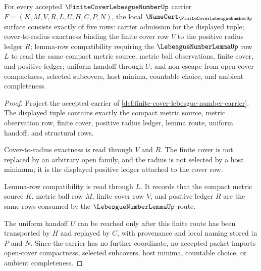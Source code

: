 \begin{theorem}
\label{thm:finite-cover-lebesgue-number-namecert-obligations}
For every accepted $\FiniteCoverLebesgueNumberUp$ carrier $F=(K,M,V,R,L,U,H,C,P,N)$, the local $\NameCert_{\FiniteCoverLebesgueNumberUp}$ surface consists exactly of five rows: carrier admission for the displayed tuple; cover-to-radius exactness binding the finite cover row $V$ to the positive radius ledger $R$; lemma-row compatibility requiring the $\LebesgueNumberLemmaUp$ row $L$ to read the same compact metric source, metric ball observations, finite cover, and positive ledger; uniform handoff through $U$; and non-escape from open-cover compactness, selected subcovers, host minima, countable choice, and ambient completeness.
\end{theorem}
\begin{proof}
Project the accepted carrier of \autoref{def:finite-cover-lebesgue-number-carrier}. The displayed tuple contains exactly the compact metric source, metric observation row, finite cover, positive radius ledger, lemma route, uniform handoff, and structural rows.

Cover-to-radius exactness is read through $V$ and $R$. The finite cover is not replaced by an arbitrary open family, and the radius is not selected by a host minimum; it is the displayed positive ledger attached to the cover row.

Lemma-row compatibility is read through $L$. It records that the compact metric source $K$, metric ball row $M$, finite cover row $V$, and positive ledger $R$ are the same rows consumed by the $\LebesgueNumberLemmaUp$ route.

The uniform handoff $U$ can be reached only after this finite route has been transported by $H$ and replayed by $C$, with provenance and local naming stored in $P$ and $N$. Since the carrier has no further coordinate, no accepted packet imports open-cover compactness, selected subcovers, host minima, countable choice, or ambient completeness.
\end{proof}

